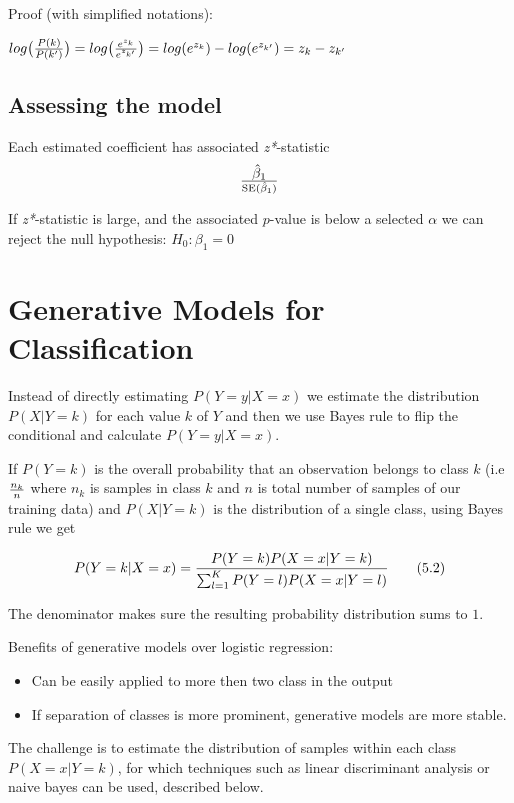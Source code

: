Proof (with simplified notations):

\(log\big({P(k) \over P(k')}\big) = log\big({e^{z_k} \over e^{z_{k'}}}\big) = log(e^{z_k}) - log(e^{z_{k'}}) = z_k - z_{k'}\)

\subsection{Assessing the model}

Each estimated coefficient has associated \textit{z*}-statistic
\[\hat \beta_1 \over \operatorname{SE}(\hat \beta_1)\]

If \textit{z*}-statistic is large, and the associated \(p\)-value is below a selected \(\alpha\) we can reject the null hypothesis: \(H_0: \beta_1 = 0\)

\section{Generative Models for Classification}

Instead of directly estimating \(P(Y = y|X = x)\) we estimate the distribution \(P(X|Y=k)\) for each value \(k\) of \(Y\) and then we use Bayes rule to flip the conditional and calculate \(P(Y = y|X = x)\).

If \(P(Y = k)\) is the overall probability that an observation belongs to class \(k\) (i.e \(n_k \over n\) where \(n_k\) is samples in class \(k\) and \(n\) is total number of samples of our training data) and \(P(X | Y = k)\) is the distribution of a single class, using Bayes rule we get

\begin{equation}P(Y = k|X = x) = {P(Y = k) P(X = x | Y = k) \over \sum_{l=1}^K P(Y = l) P(X = x | Y = l)}\tag{5.2}\end{equation}

The denominator makes sure the resulting probability distribution sums to \(1\).

Benefits of generative models over logistic regression:

\begin{itemize}
    \item Can be easily applied to more then two class in the output
    \item If separation of classes is more prominent, generative models are more stable.
\end{itemize}

The challenge is to estimate the distribution of samples within each class \(P(X = x | Y = k)\), for which techniques such as linear discriminant analysis or naive bayes can be used, described below.


